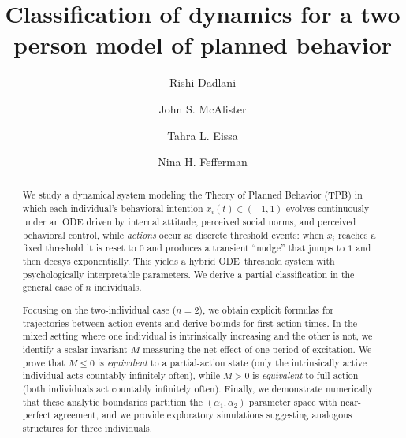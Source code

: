 \documentclass[preprint,12pt]{elsarticle}
\begin{document}
\begin{frontmatter}


\title{Classification of dynamics for a two person model of planned behavior}


\author[label1]{Rishi Dadlani}

\author[label2,label3]{John S. McAlister}

\author[label4]{Tahra L. Eissa}

\author[label3,label5,label6]{Nina H. Fefferman}









\begin{abstract}
We study a dynamical system modeling the Theory of Planned Behavior (TPB) in which each individual’s behavioral intention $x_i(t)\in(-1,1)$ evolves continuously under an ODE driven by internal attitude, perceived social norms, and perceived behavioral control, while \emph{actions} occur as discrete threshold events: when $x_i$ reaches a fixed threshold it is reset to $0$ and produces a transient “nudge” that jumps to $1$ and then decays exponentially. This yields a hybrid ODE–threshold system with psychologically interpretable parameters. We derive a partial classification in the general case of $n$ individuals.

Focusing on the two-individual case ($n=2$), we obtain explicit formulas for trajectories between action events and derive bounds for first-action times. In the mixed setting where one individual is intrinsically increasing  and the other is not, we identify a scalar invariant $M$ measuring the net effect of one period of excitation. We prove that $M\le 0$ is \emph{equivalent} to a partial-action state (only the intrinsically active individual acts countably infinitely often), while $M>0$ is \emph{equivalent} to full action (both individuals act countably infinitely often). Finally, we demonstrate numerically that these analytic boundaries partition the $(\alpha_1,\alpha_2)$ parameter space with near-perfect agreement, and we provide exploratory simulations suggesting analogous structures for three individuals.
\end{abstract}


\end{frontmatter}
\end{document}

